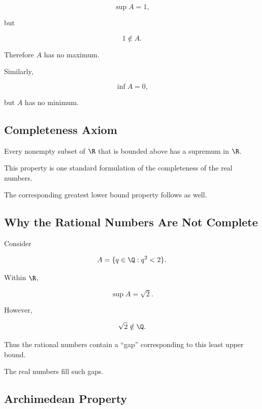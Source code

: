 \[
\boxed{
\sup A=1,
}
\]

but

\[
1\notin A.
\]

Therefore \(A\) has no maximum.

Similarly,

\[
\inf A=0,
\]

but \(A\) has no minimum.

\subsection{Completeness Axiom}
\label{subsec:completeness-axiom}

\begin{theorem}
Every nonempty subset of \(\R\) that is bounded above has a supremum in
\(\R\).
\end{theorem}

This property is one standard formulation of the completeness of the real
numbers.

The corresponding greatest lower bound property follows as well.

\subsection{Why the Rational Numbers Are Not Complete}
\label{subsec:rationals-not-complete}

Consider

\[
A=
\{q\in\Q:q^2<2\}.
\]

Within \(\R\),

\[
\sup A=\sqrt2.
\]

However,

\[
\sqrt2\notin\Q.
\]

Thus the rational numbers contain a ``gap'' corresponding to this least
upper bound.

The real numbers fill such gaps.

\subsection{Archimedean Property}
\label{subsec:archimedean-property}

